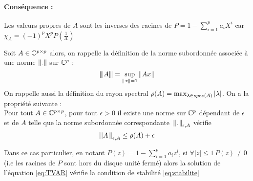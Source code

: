\documentclass[a4paper,french]{article}
\begin{document}
\paragraph{Conséquence :}
Les valeurs propres de $A$ sont les inverses des racines de $P = 1- \sum_{i=1}^p a_i X^i$
car $\chi_A = (-1)^p X^p P\left( \frac{1}{X}\right)$
\begin{Lem}\label{lem:approx_rayon_spec}
Soit $A \in \mathbb{C}^{p\times p}$ alors, on rappelle la définition de la norme subordonnée associée à une norme ${ \left\| . \right\|}$ sur $\mathbb{C}^p$ : \[
{\left\vert\kern-0.25ex\left\vert\kern-0.25ex\left\vert A \right\vert\kern-0.25ex\right\vert\kern-0.25ex\right\vert} = \sup_{{ \left\| x \right\|} = 1} { \left\| Ax \right\|}
\]
On rappelle aussi la définition du rayon spectral $ \rho(A) = \max_{\lambda \in spec(A)} { \left| \lambda \right|}$. On a la propriété suivante : \\
Pour tout $A \in \mathbb{C}^{p\times p}$, pour tout  $\epsilon >0$ il existe une norme sur $\mathbb{C}^p$ dépendant de $\epsilon$ et de $A$ telle que la norme subordonnée correspondante ${\left\vert\kern-0.25ex\left\vert\kern-0.25ex\left\vert . \right\vert\kern-0.25ex\right\vert\kern-0.25ex\right\vert}_{\epsilon,A}$ vérifie
\[
{\left\vert\kern-0.25ex\left\vert\kern-0.25ex\left\vert A \right\vert\kern-0.25ex\right\vert\kern-0.25ex\right\vert}_{\epsilon,A} \leq \rho(A) + \epsilon
\]
\end{Lem}
\begin{Prop}
Dans ce cas particulier, en notant $P(z) = 1 - \sum_{i=1}^p a_i z^i$, si $\forall |z| \leq 1\, P(z)\neq 0$ (i.e les racines de $P$ sont hors du disque unité fermé) alors la solution de l'équation \eqref{eq:TVAR} vérifie la condition de stabilité \eqref{eq:stabilite}
\end{Prop}
\end{document}
